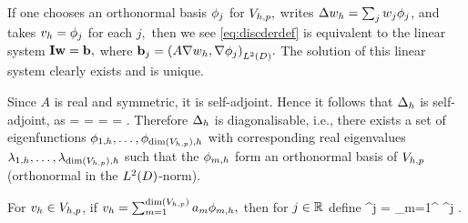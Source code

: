 If one chooses an orthonormal basis $\phi_{j}$ for $V_{h,p},$ writes $\Delta w_{h} = \sum_j w_{j} \phi_{j}$, and takes $v_{h} = \phi_{j}$ for each $j,$ then we see \cref{eq:discderdef} is equivalent to the linear system $\mathbf{I} \mathbf{w} = \mathbf{b},$ where $\bb_{j} = \IPLtD{A \grad \wh}{\grad \phij}.$ The solution of this linear system clearly exists and is unique.
\epf


Since $A$ is real and symmetric, it is self-adjoint. Hence it follows that $\Delta_{h}$ is self-adjoint, as
\beqs
\IPLtD{\Deltah \wh}{\vh} =  =  = \overline{\IPLtD{\Deltah \vh}{\wh}} = \IPLtD{\wh}{\Deltah \vh}.
\eeqs
Therefore $\Delta_{h}$ is diagonalisable, i.e., there exists a set of eigenfunctions $\phioh,\ldots,\phidimVhph$  with corresponding real eigenvalues $\lambdaoh, \ldots, \lambdadimVhph$ such that the $\phi_{m,h}$ form an orthonormal basis of $V_{h,p}$ (orthonormal in the $\LtD$-norm).

For $v_{h} \in V_{h,p}$, if $\vh = \sum_{m=1}^{\dimVhp} \am \phimh,$ then for $j \in \mathbb R$ define
\beqs
\Deltah^j \vh = \sum_{m=1}^{\dimVhp} \lambdamh^j \am \phimh.
\eeqs

